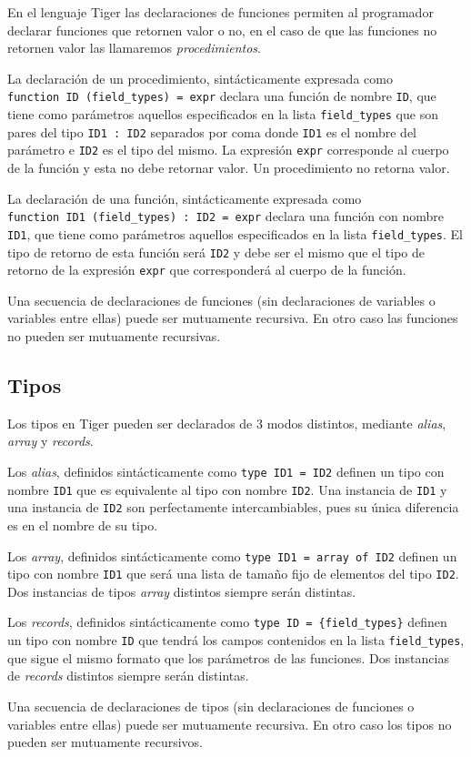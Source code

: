 \documentclass{article}
\begin{document}
En el lenguaje Tiger las declaraciones de funciones permiten al programador
declarar funciones que retornen valor o no, en el caso de que las funciones no
retornen valor las llamaremos \emph{procedimientos}.

La declaración de un procedimiento, sintácticamente expresada como \\
\verb|function ID (field_types) = expr| declara una función de nombre
\verb|ID|, que tiene como parámetros aquellos especificados en la lista
\verb|field_types| que son pares del tipo \verb|ID1 : ID2| separados por
coma donde \verb|ID1| es el nombre del parámetro e \verb|ID2| es el tipo del
mismo. La expresión \verb|expr| corresponde al cuerpo de la función y esta no
debe retornar valor. Un procedimiento no retorna valor.

La declaración de una función, sintácticamente expresada como \\
\verb|function ID1 (field_types) : ID2 = expr| declara una función con nombre
\verb|ID1|, que tiene como parámetros aquellos especificados en la lista
\verb|field_types|. El tipo de retorno de esta función será \verb|ID2| y debe
ser el mismo que el tipo de retorno de la expresión \verb|expr| que
corresponderá al cuerpo de la función.

Una secuencia de declaraciones de funciones (sin declaraciones de variables o
variables entre ellas) puede ser mutuamente recursiva. En otro caso las
funciones no pueden ser mutuamente recursivas.

\subsection{Tipos}

Los tipos en Tiger pueden ser declarados de 3 modos distintos, mediante
\emph{alias}, \emph{array} y \emph{records}.

Los \emph{alias}, definidos sintácticamente como \verb|type ID1 = ID2| definen
un tipo con nombre \verb|ID1| que es equivalente al tipo con nombre \verb|ID2|.
Una instancia de \verb|ID1| y una instancia de \verb|ID2| son perfectamente
intercambiables, pues su única diferencia es en el nombre de su tipo.

Los \emph{array}, definidos sintácticamente como \verb|type ID1 = array of ID2|
definen un tipo con nombre \verb|ID1| que será una lista de tamaño fijo de
elementos del tipo \verb|ID2|. Dos instancias de tipos \emph{array} distintos
siempre serán distintas.

Los \emph{records}, definidos sintácticamente como \verb|type ID = {field_types}|
definen un tipo con nombre \verb|ID| que tendrá los campos contenidos en la
lista \verb|field_types|, que sigue el mismo formato que los parámetros de las
funciones. Dos instancias de \emph{records} distintos siempre serán distintas.

Una secuencia de declaraciones de tipos (sin declaraciones de funciones o
variables entre ellas) puede ser mutuamente recursiva. En otro caso los tipos
no pueden ser mutuamente recursivos.
\end{document}
